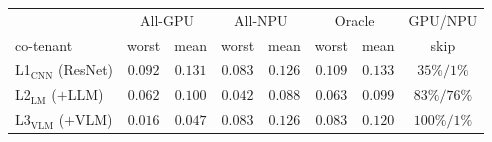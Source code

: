 \begin{tabular}{lcc|cc|cc|c}
\toprule
 & \multicolumn{2}{c|}{All-GPU} & \multicolumn{2}{c|}{All-NPU} & \multicolumn{2}{c|}{Oracle} & GPU/NPU \\
co-tenant & worst & mean & worst & mean & worst & mean & skip \\
\midrule
L1$_{\text{CNN}}$ (ResNet)   & $0.092$ & $0.131$ & $0.083$ & $0.126$ & $0.109$ & $0.133$ & $35\% / 1\%$ \\
L2$_{\text{LM}}$ ($+$LLM)   & $\mathbf{0.062}$ & $0.100$ & $0.042$ & $0.088$ & $0.063$ & $0.099$ & $83\% / 76\%$ \\
L3$_{\text{VLM}}$ ($+$VLM)  & $0.016$ & $0.047$ & $\mathbf{0.083}$ & $0.126$ & $0.083$ & $0.120$ & $100\% / 1\%$ \\
\bottomrule
\end{tabular}
